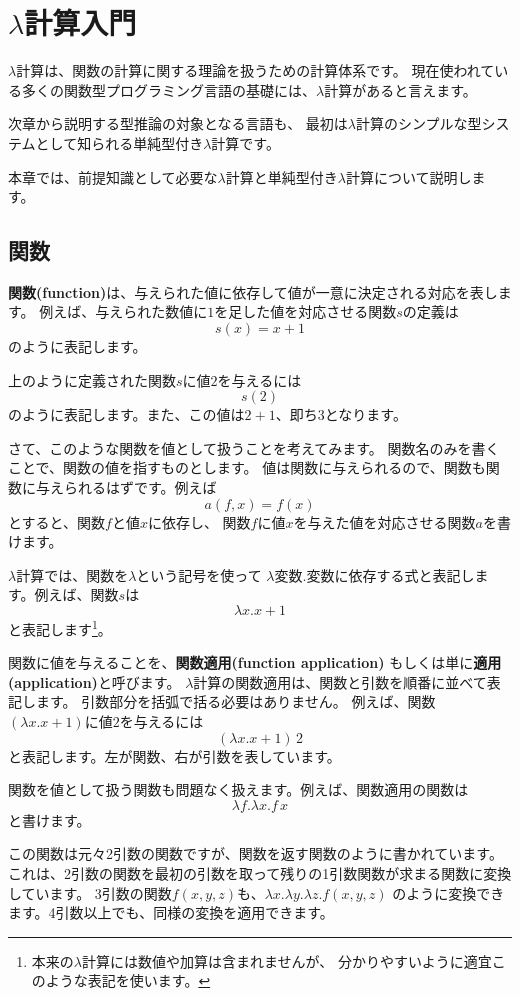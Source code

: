 
\chapter{$\lambda$計算入門}

$\lambda$計算は、関数の計算に関する理論を扱うための計算体系です。
現在使われている多くの関数型プログラミング言語の基礎には、$\lambda$計算があると言えます。

次章から説明する型推論の対象となる言語も、
最初は$\lambda$計算のシンプルな型システムとして知られる単純型付き$\lambda$計算です。

本章では、前提知識として必要な$\lambda$計算と単純型付き$\lambda$計算について説明します。

\section{関数}

\textbf{関数(function)}は、与えられた値に依存して値が一意に決定される対応を表します。
例えば、与えられた数値に$1$を足した値を対応させる関数$s$の定義は
\[
  s(x) = x+1
\]
のように表記します。

上のように定義された関数$s$に値$2$を与えるには
\[
  s(2)
\]
のように表記します。また、この値は$2+1$、即ち$3$となります。

さて、このような関数を値として扱うことを考えてみます。
関数名のみを書くことで、関数の値を指すものとします。
値は関数に与えられるので、関数も関数に与えられるはずです。例えば
\[
  a(f, x) = f(x)
\]
とすると、関数$f$と値$x$に依存し、
関数$f$に値$x$を与えた値を対応させる関数$a$を書けます。

$\lambda$計算では、関数を$\lambda$という記号を使って
$\lambda \text{変数} . \text{変数に依存する式}$と表記します。例えば、関数$s$は
\[
  \lambda x . x + 1
\]
と表記します\footnote{本来の$\lambda$計算には数値や加算は含まれませんが、
分かりやすいように適宜このような表記を使います。}。

関数に値を与えることを、\textbf{関数適用(function application)}
もしくは単に\textbf{適用(application)}と呼びます。
$\lambda$計算の関数適用は、関数と引数を順番に並べて表記します。
引数部分を括弧で括る必要はありません。
例えば、関数$(\lambda x . x + 1)$に値$2$を与えるには
\[
  (\lambda x . x + 1) \, 2
\]
と表記します。左が関数、右が引数を表しています。

関数を値として扱う関数も問題なく扱えます。例えば、関数適用の関数は
\[
  \lambda f . \lambda x . f \, x
\]
と書けます。

この関数は元々2引数の関数ですが、関数を返す関数のように書かれています。
これは、2引数の関数を最初の引数を取って残りの1引数関数が求まる関数に変換しています。
3引数の関数$f(x, y, z)$も、$\lambda x . \lambda y . \lambda z . f(x, y, z)$
のように変換できます。4引数以上でも、同様の変換を適用できます。

